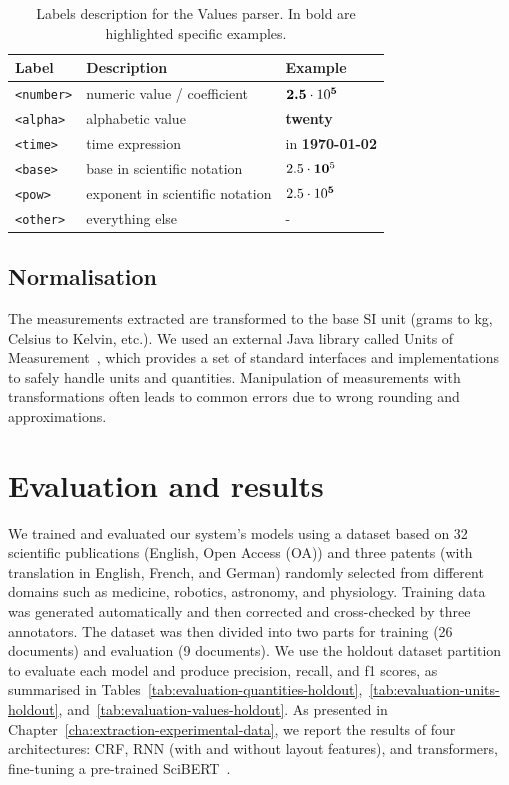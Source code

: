 \begin{table}[htbp]
\centering
  \caption{Labels description for the Values parser. In bold are highlighted specific examples.}
  \label{tab:values-model-labels}
  \begin{tabular}{lll}
    \toprule
    Label & Description & Example\\
    \midrule
    \texttt{<number>} & numeric value / coefficient & $\textbf{2.5}\cdot10\textsuperscript{\textbf{5}}$ \\
    \texttt{<alpha>} & alphabetic value & \textbf{twenty} \\
    \texttt{<time>} & time expression  & in \textbf{1970-01-02}\\
    \texttt{<base>} & base in scientific notation & $2.5\cdot\textbf{10}\textsuperscript{5}$\\
    \texttt{<pow>} & exponent in scientific notation & $2.5\cdot10\textsuperscript{\textbf{5}}$ \\
    \texttt{<other>} & everything else & - \\
  \bottomrule
\end{tabular}
\end{table}

\subsection{Normalisation}

The measurements extracted are transformed to the base SI unit (grams to kg, Celsius to Kelvin, etc.). We used an external Java library called Units of Measurement~\cite{units_of_measurement}, which provides a set of standard interfaces and implementations to safely handle units and quantities. Manipulation of measurements with transformations often leads to common errors due to wrong rounding and approximations. 

\section{Evaluation and results}
\label{sec:results}

We trained and evaluated our system's models using a dataset based on 32 scientific publications (English, Open Access (OA)) and three patents (with translation in English, French, and German) randomly selected from different domains such as medicine, robotics, astronomy, and physiology. 
Training data was generated automatically and then corrected and cross-checked by three annotators. The dataset was then divided into two parts for training (26 documents) and evaluation (9 documents).
We use the holdout dataset partition to evaluate each model and produce precision, recall, and f1 scores, as summarised in Tables~\ref{tab:evaluation-quantities-holdout},~\ref{tab:evaluation-units-holdout}, and~\ref{tab:evaluation-values-holdout}. 
As presented in Chapter~\ref{cha:extraction-experimental-data}, we report the results of four architectures: CRF, RNN (with and without layout features), and transformers, fine-tuning a pre-trained SciBERT~\cite{Beltagy2019SciBERT}. 

